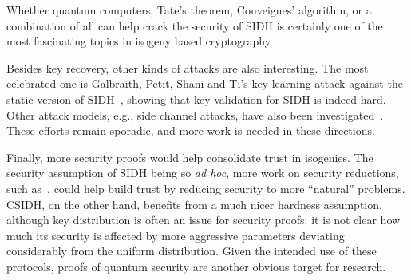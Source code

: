 \documentclass{report}
\theoremstyle{plain}
\theoremstyle{definition}
\begin{document}
Whether quantum computers, Tate's theorem, Couveignes' algorithm, or a
combination of all can help crack the security of SIDH is certainly
one of the most fascinating topics in isogeny based cryptography.

Besides key recovery, other kinds of attacks are also interesting. %
The most celebrated one is Galbraith, Petit, Shani and Ti's key
learning attack against the static version of
SIDH~\cite{galbraithsecurity}, showing that key validation for SIDH is
indeed hard. %
Other attack models, e.g., side channel attacks, have also been
investigated~\cite{gelin2017loop,ti2017fault}. %
These efforts remain sporadic, and more work is needed in these
directions. %

Finally, more security proofs would help consolidate trust in
isogenies. %
The security assumption of SIDH being so \emph{ad hoc}, more work on
security reductions, such
as~\cite{galbraithsecurity,cryptoeprint:2017:962}, could help build
trust by reducing security to more ``natural'' problems. %
CSIDH, on the other hand, benefits from a much nicer hardness
assumption, although key distribution is often an issue for security
proofs: it is not clear how much its security is affected by more
aggressive parameters deviating considerably from the uniform
distribution. %
Given the intended use of these protocols, proofs of quantum security
are another obvious target for research.










\clearpage


\end{document}
